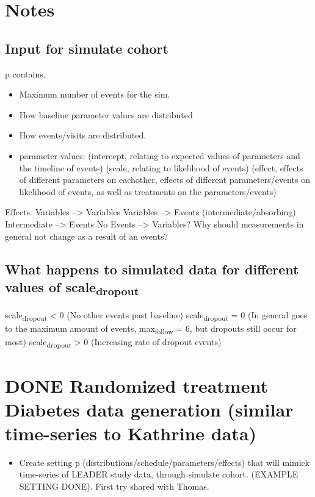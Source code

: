 \documentclass[11pt]{article}
\date{\today}
\title{}
\begin{document}
\tableofcontents

\section{Notes}
\label{sec:orgd88496e}

\subsection{Input for simulate cohort}
\label{sec:orgbf1423a}
p contains,
\begin{itemize}
\item Maximum number of events for the sim.
\item How baseline parameter values are distributed
\item How events/visits are distributed.
\item parameter values:
(intercept, relating to expected values of parameters and the
timeline of events)
(scale, relating to likelihood of events)
(effect, effects of different parameters on eachother,
effects of different parameters/events on likelihood of events,
as well as treatments on the parameters/events)
\end{itemize}
Effects.
Variables --> Variables
Variables --> Events (intermediate/absorbing)
Intermediate --> Events
No
Events --> Variables? Why should measurements in general not change
as a result of an events?
\subsection{What happens to simulated data for different values of scale\textsubscript{dropout}}
\label{sec:org4c0d2a0}
scale\textsubscript{dropout} < 0 (No other events past baseline)
scale\textsubscript{dropout} = 0 (In general goes to the maximum amount of events,
max\textsubscript{follow} = 6, but dropouts still occur for most)
scale\textsubscript{dropout} > 0 (Increasing rate of dropout events)
\section{{\bfseries\sffamily DONE} Randomized treatment Diabetes data generation (similar time-series to Kathrine data)}
\label{sec:org8c759f1}
\begin{itemize}
\item Create setting p (distributions/schedule/parameters/effects) that
will mimick time-series of LEADER study data, through simulate
cohort. (EXAMPLE SETTING DONE). First try shared with Thomas.
\end{itemize}
\end{document}
